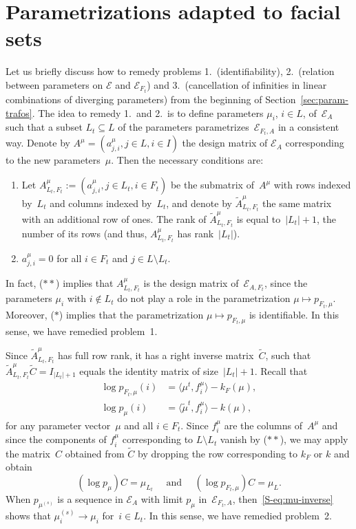 \documentclass[aos,noinfoline]{imsart}
\def\<{\langle}
\def\>{\rangle}
\newcommand{\Ecal}{\mathcal{E}}
\theoremstyle{remark}
\theoremstyle{definition}
\begin{document}
\section{Parametrizations adapted to facial sets}
\label{S-sec:best-parameters}

Let us briefly discuss how to remedy problems 1.\ (identifiability), 2.\ (relation between parameters on $\Ecal$ and $\Ecal_{F_{t}}$) and 3.\ (cancellation of infinities in linear combinations of diverging parameters) from the beginning of Section~\ref{sec:param-trafos}.  The idea
to remedy 1.\ and 2.\ is to define parameters $\mu_{i}$, $i\in L$, of~$\Ecal_{A}$ such that a subset $L_{t}\subseteq L$
of the parameters parametrizes~$\Ecal_{F_{t},A}$ in a consistent way.  Denote by $A^{\mu}=(a^{\mu}_{j,i}, j\in L, i\in
I)$ the design matrix of $\Ecal_{A}$ corresponding to the new parameters~$\mu$.  Then the necessary conditions are:
\begin{enumerate}
\item[($*$)] Let $A^{\mu}_{L_{t},F_{t}}:=(a^{\mu}_{j,i}, j\in L_{t}, i\in F_{t})$ be the submatrix of~$A^{\mu}$ with
  rows indexed by~$L_{t}$ and columns indexed by~$L_{t}$, and denote by $\tilde A^{\mu}_{L_{t},F_{t}}$ the same matrix
  with an additional row of ones.  The rank of $\tilde A^{\mu}_{L_{t},F_{t}}$ is equal to~$|L_{t}|+1$, the number of
  its rows (and thus, $A^{\mu}_{L_{t},F_{t}}$ has rank~$|L_{t}|$).
\item[($**$)] $a^{\mu}_{j,i}=0$ for all $i\in F_{t}$ and $j\in L\setminus L_{t}$.
\end{enumerate}
In fact, ($**$) implies that $A^{\mu}_{L_{t},F_{t}}$ is the design matrix of~$\Ecal_{A,F_{t}}$, since the parameters
$\mu_{i}$ with $i\notin L_{t}$ do not play a role in the parametrization $\mu\mapsto p_{F_{t},\mu}$.  Moreover, ($*$)
implies that the parametrization $\mu\mapsto p_{F_{t},\mu}$ is identifiable.  In this sense, we have remedied
problem~1.

Since $\tilde A^{\mu}_{L_{t},F_{t}}$ has full row rank, it has a right inverse matrix~$\tilde C$, such that
$\tilde A^{\mu}_{L_{t},F_{t}}\tilde C=I_{|L_{t}|+1}$ equals the identity matrix of size~$|L_{t}|+1$.  Recall that
\begin{align*}
  \log p_{F_{t},\mu}(i) &= \<\mu^{t}, f^{\mu}_{i} \> - k_{F}(\mu), \\
  \log p_{\mu}(i) &= \<\tilde\mu^{t}, f^{\mu}_{i} \> - k(\mu),
\end{align*}
for any parameter vector~$\mu$ and all $i\in F_{t}$.  Since $f^{\mu}_{i}$ are the columns of~$A^{\mu}$ and since the
components of $f^{\mu}_{i}$ corresponding to $L\setminus L_{t}$ vanish by ($**$), we may apply the matrix~$C$ obtained
from $\tilde C$ by dropping the row corresponding to $k_{F}$ or $k$ and obtain
\begin{equation}
  \label{S-eq:mu-inverse}
  (\log p_{\mu})C = \mu_{L_{t}}
  \quad\text{ and }\quad
  (\log p_{F_{t},\mu})C = \mu_{L}.
\end{equation}
When $p_{\mu^{(s)}}$ is a sequence in $\Ecal_{A}$ with limit $p_{\mu}$ in~$\Ecal_{F_{t},A}$,
then~\eqref{S-eq:mu-inverse} shows that $\mu_{i}^{(s)}\to\mu_{i}$ for~$i\in L_{t}$.  In this sense, we have remedied
problem~2.
\end{document}
